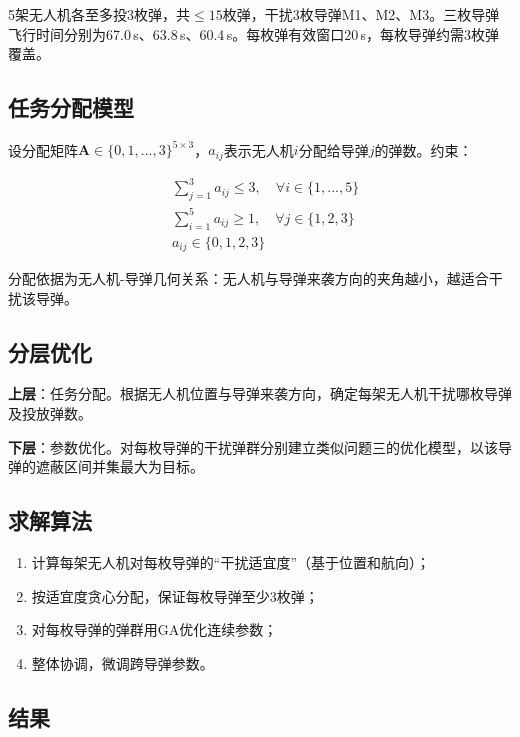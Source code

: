\documentclass[a4paper]{ctexart}
\newcommand{\bm}[1]{\boldsymbol{#1}}
\begin{document}
5架无人机各至多投3枚弹，共$\leq 15$枚弹，干扰3枚导弹M1、M2、M3。三枚导弹飞行时间分别为67.0\,s、63.8\,s、60.4\,s。每枚弹有效窗口20\,s，每枚导弹约需3枚弹覆盖。

\subsection{任务分配模型}

设分配矩阵$\bm{A} \in \{0,1,...,3\}^{5\times 3}$，$a_{ij}$表示无人机$i$分配给导弹$j$的弹数。约束：

\begin{equation}
\begin{aligned}
& \sum_{j=1}^{3} a_{ij} \leq 3, \quad \forall i \in \{1,...,5\} \\
& \sum_{i=1}^{5} a_{ij} \geq 1, \quad \forall j \in \{1,2,3\} \\
& a_{ij} \in \{0, 1, 2, 3\}
\end{aligned}
\label{eq:allocation}
\end{equation}

分配依据为无人机-导弹几何关系：无人机与导弹来袭方向的夹角越小，越适合干扰该导弹。

\subsection{分层优化}

\textbf{上层}：任务分配。根据无人机位置与导弹来袭方向，确定每架无人机干扰哪枚导弹及投放弹数。

\textbf{下层}：参数优化。对每枚导弹的干扰弹群分别建立类似问题三的优化模型，以该导弹的遮蔽区间并集最大为目标。

\subsection{求解算法}

\begin{enumerate}[label=\textbf{步骤\arabic*：}]
  \item 计算每架无人机对每枚导弹的``干扰适宜度''（基于位置和航向）；
  \item 按适宜度贪心分配，保证每枚导弹至少3枚弹；
  \item 对每枚导弹的弹群用GA优化连续参数；
  \item 整体协调，微调跨导弹参数。
\end{enumerate}

\subsection{结果}
\end{document}

